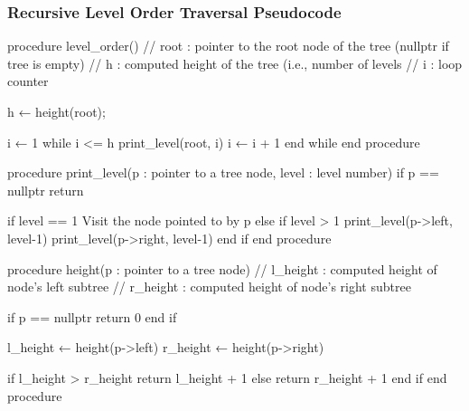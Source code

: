 \documentclass{report}
\begin{document}
    \pagebreak 
    \subsubsection{Recursive Level Order Traversal Pseudocode}
    \bigbreak \noindent 
    \begin{cppcode}
    procedure level_order()
    // root : pointer to the root node of the tree (nullptr if tree is empty)
    // h    : computed height of the tree (i.e., number of levels
    // i    : loop counter
    
    h ← height(root);

    i ← 1
    while i <= h
        print_level(root, i)
        i ← i + 1
     end while
end procedure

procedure print_level(p : pointer to a tree node, level : level number)
    if p == nullptr
        return

    if level == 1
        Visit the node pointed to by p
    else if level > 1
        print_level(p->left, level-1)
        print_level(p->right, level-1)
    end if
end procedure

procedure height(p : pointer to a tree node)
    // l_height : computed height of node's left subtree
    // r_height : computed height of node's right subtree
    
    if p == nullptr
        return 0
    end if

    l_height ← height(p->left)
    r_height ← height(p->right)

    if l_height > r_height
        return l_height + 1
    else
        return r_height + 1
    end if
end procedure
    \end{cppcode}
\end{document}
